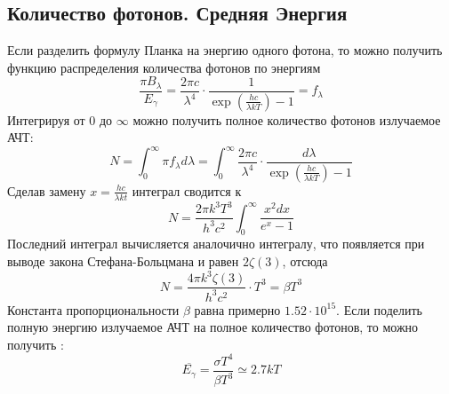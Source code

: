 \subsection{Количество фотонов. Средняя Энергия}
Если разделить формулу Планка на энергию одного фотона, то можно получить функцию распределения количества фотонов по энергиям
\begin{equation*}
	\frac{\pi B_{\lambda}}{E_{\gamma}} = \frac{2 \pi c}{\lambda^4} \cdot \frac{1}{\exp\left(\frac{hc}{\lambda k T}\right)-1} = f_{\lambda}
\end{equation*}
Интегрируя от 0 до $\infty$ можно получить полное количество фотонов излучаемое АЧТ:
\begin{equation*}
	N = \int_{0}^{\infty}{\pi f_{\lambda}d\lambda} = \int_{0}^{\infty}{\frac{2\pi c}{\lambda^4} \cdot \frac{d\lambda}{\exp\left(\frac{hc}{\lambda k T}\right)-1}}
\end{equation*}
Сделав замену $x = \frac{hc}{\lambda kt}$ интеграл сводится к
\begin{equation*}
	N = \frac{2\pi k^3 T^3}{h^3 c^2}\int_{0}^{\infty}{\frac{x^2 dx}{e^x-1}}
\end{equation*}
Последний интеграл вычисляется аналочично интегралу, что появляется при выводе закона Стефана-Больцмана и равен $2\zeta(3)$, отсюда
\begin{equation}
	N = \frac{4\pi k^3 \zeta(3)}{h^3 c^2} \cdot T^3 = \beta T^3
\end{equation}
Константа пропорциональности $\beta$ равна примерно $1.52 \cdot 10^{15}$. Если поделить полную энергию излучаемое АЧТ на полное количество фотонов, то можно получить :
\begin{equation}
	\overline{E_{\gamma}} = \frac{\sigma T^4}{\beta T^3} \simeq 2.7 k T
\end{equation}